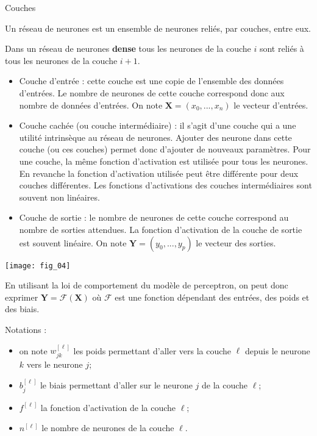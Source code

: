 \begin{defi}{Couches} 

Un réseau de neurones est un ensemble de neurones reliés, par couches, entre eux. 

Dans un réseau de neurones \textbf{dense} tous les neurones de la couche $i$ sont reliés à tous les neurones de la couche $i+1$.

\begin{itemize}
\item Couche d'entrée : cette couche est une copie de l'ensemble des données d'entrées. Le nombre de neurones de cette couche correspond donc aux nombre de données d'entrées. On note $\mathbf{X} = \left( x_0, ..., x_n\right)$ le vecteur d'entrées.
\item Couche cachée (ou couche intermédiaire) : il s'agit d'une couche qui a une utilité intrinsèque au réseau de neurones. Ajouter des neurone dans cette couche (ou ces couches) permet donc d'ajouter de nouveaux paramètres.  Pour une couche, la même fonction d'activation est utilisée pour tous les neurones. En revanche la fonction d'activation utilisée peut être différente pour deux couches différentes. Les fonctions d'activations des couches intermédiaires sont souvent non linéaires.
\item Couche de sortie : le nombre de neurones de cette couche correspond au nombre de sorties attendues. La fonction d'activation de la couche de sortie est souvent linéaire. On note $\mathbf{Y} = \left( y_0, ..., y_p\right)$ le vecteur des sorties.
\end{itemize}
\begin{center}
\texttt{[image: fig\_04]}
\end{center}

En utilisant la loi de comportement du modèle de perceptron, on peut donc exprimer $\mathbf{Y}=\mathcal{F}\left(\mathbf{X}\right)$ 
où $\mathcal{F}$ est une fonction dépendant des entrées, des poids et des biais.


Notations : 
\begin{itemize}
\item on note $w^{[\ell]}_{jk}$ les poids permettant d'aller vers la couche $\ell$ depuis le neurone $k$ vers le neurone $j$;
\item $b^{[\ell]}_{j}$ le biais permettant d'aller sur le neurone $j$ de la couche $\ell$;
\item $f^{[\ell]}$ la fonction d'activation de la couche $\ell$;
\item $n^{[\ell]}$ le nombre de neurones de la couche $\ell$.
\end{itemize}
\end{defi}

